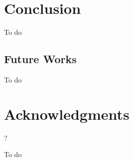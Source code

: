\documentclass[letterpaper, 10 pt, conference]{ieeeconf}  %
\begin{document}
\section{Conclusion}

To do


\subsection{Future Works}

To do

\section{Acknowledgments}

?





\begin{thebibliography}{99}

To do


\end{thebibliography}
\end{document}
